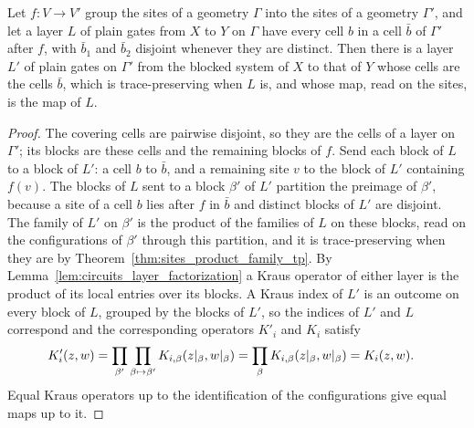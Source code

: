 \begin{theorem}
    \label{thm:circuits_coarsen}
    \leanok
    Let $f:V\to V'$ group the sites of a geometry $\Gamma$ into the sites of a geometry
    $\Gamma'$, and let a layer $L$ of plain gates from $X$ to $Y$ on $\Gamma$ have every cell
    $b$ in a cell $\bar b$ of $\Gamma'$ after $f$, with $\bar b_1$ and $\bar b_2$ disjoint
    whenever they are distinct. Then there is a layer $L'$ of plain gates on $\Gamma'$ from
    the blocked system of $X$ to that of $Y$ whose cells are the cells $\bar b$, which is
    trace-preserving when $L$ is, and whose map, read on the sites, is the map of $L$.
\end{theorem}
\begin{proof}\leanok
    The covering cells are pairwise disjoint, so they are the cells of a layer on $\Gamma'$;
    its blocks are these cells and the remaining blocks of $f$. Send each block of $L$ to a
    block of $L'$: a cell $b$ to $\bar b$, and a remaining site $v$ to the block of $L'$
    containing $f(v)$. The blocks of $L$ sent to a block $\beta'$ of $L'$ partition the
    preimage of $\beta'$, because a site of a cell $b$ lies after $f$ in $\bar b$ and distinct
    blocks of $L'$ are disjoint. The family of $L'$ on $\beta'$ is the product of the families
    of $L$ on these blocks, read on the configurations of $\beta'$ through this partition, and
    it is trace-preserving when they are by Theorem~\ref{thm:sites_product_family_tp}. By
    Lemma~\ref{lem:circuits_layer_factorization} a Kraus operator of either layer is the
    product of its local entries over its blocks. A Kraus index of $L'$ is an outcome on every
    block of $L$, grouped by the blocks of $L'$, so the indices of $L'$ and $L$ correspond and
    the corresponding operators $K'_i$ and $K_i$ satisfy
    \begin{align}
        K'_i(z,w)&=\prod_{\beta'}\prod_{\beta\mapsto\beta'}K_{i,\beta}(z|_\beta,w|_\beta)
        =\prod_\beta K_{i,\beta}(z|_\beta,w|_\beta)=K_i(z,w).
        \notag
    \end{align}
    Equal Kraus operators up to the identification of the configurations give equal maps up
    to it.
\end{proof}


